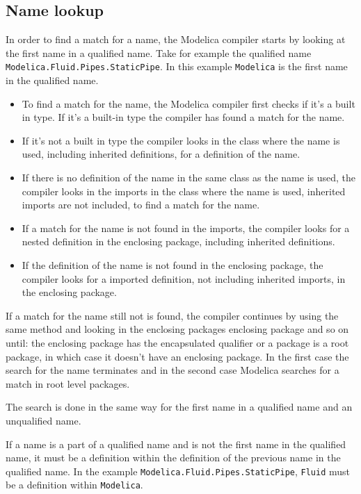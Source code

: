 \documentclass{cslthse-msc}
\begin{document}
\subsection{Name lookup}
In order to find a match for a name, the Modelica compiler starts by looking at the first name in a qualified name. \cite{modelicamodelica, tillermodelica} Take for example the qualified name \\ \texttt{Modelica.Fluid.Pipes.StaticPipe}. In this example \texttt{Modelica} is the first name in the qualified name.
\begin{itemize}
\item To find a match for the name, the Modelica compiler first checks if it's a built in type. If it's a built-in type the compiler has found a match for the name.

\item If it's not a built in type the compiler looks in the class where the name is used, including inherited definitions, for a definition of the name. 

\item If there is no definition of the name in the same class as the name is used, the compiler looks in the imports in the class where the name is used, inherited imports are not included, to find a match for the name.

\item If a match for the name is not found in the imports, the compiler looks for a nested definition in the enclosing package, including inherited definitions.

\item If the definition of the name is not found in the enclosing package, the compiler looks for a imported definition, not including inherited imports, in the enclosing package.
\end{itemize}
If a match for the name still not is found, the compiler continues by using the same method and looking in the enclosing packages enclosing package and so on until: the enclosing package has the encapsulated qualifier or a package is a root package, in which case it doesn't have an enclosing package. In the first case the search for the name terminates and in the second case Modelica searches for a match in root level packages.

The search is done in the same way for the first name in a qualified name and an unqualified name.

If a name is a part of a qualified name and is not the first name in the qualified name, it must be a definition within the definition of the previous name in the qualified name. In the example \texttt{Modelica.Fluid.Pipes.StaticPipe}, \texttt{Fluid} must be a definition within \texttt{Modelica}.
\end{document}
